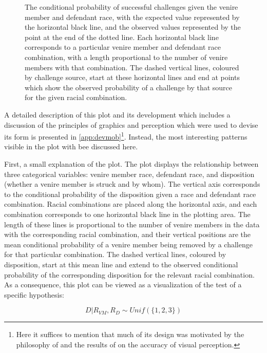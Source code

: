 \begin{figure}[!h]
  \centering
  \caption[The ``Mobile Plot'' of Racial Combination and Strikes]{The conditional probability of successful challenges given the
    venire member and defendant race, with the expected value represented by the horizontal black line, and the observed values
    represented by the point at the end of the dotted line. Each horizontal black line corresponds to a particular venire member
    and defendant race combination, with a length proportional to the number of venire members with that combination. The dashed
    vertical lines, coloured by challenge source, start at these horizontal lines and end at points which show the observed
    probability of a challenge by that source for the given racial combination.}
  \label{fig:racedefmob}
\end{figure}

A detailed description of this plot and its development which includes a discussion of the principles of graphics and perception
which were used to devise its form is presented in \ref{app:devmob}\footnote{Here it suffices to mention that much of its design
  was motivated by the philosophy of \cite{VisualDisplayQuant} and the results of \cite{cleveland1987} on the accuracy of visual
  perception.}. Instead, the most interesting patterns visible in the plot with bee discussed here.

First, a small explanation of the plot. The plot displays the relationship between three categorical variables: venire member
race, defendant race, and disposition (whether a venire member is struck and by whom). The vertical axis corresponds to the
conditional probability of the disposition given a race and defendant race combination. Racial combinations are placed along the
horizontal axis, and each combination corresponds to one horizontal black line in the plotting area. The length of these lines is
proportional to the number of venire members in the data with the corresponding racial combination, and their vertical positions
are the mean conditional probability of a venire member being removed by a challenge for that particular combination. The dashed
vertical lines, coloured by disposition, start at this mean line and extend to the observed conditional probability of the
corresponding disposition for the relevant racial combination. As a consequence, this plot can be viewed as a visualization of the
test of a specific hypothesis:

\begin{equation}
  \label{eq:vishyp}
  D | R_{VM}, R_{D} \sim Unif(\{1,2,3\})
\end{equation}

